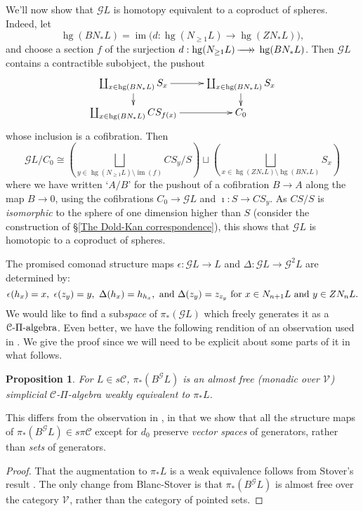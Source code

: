 \documentclass[11pt]{amsart} \renewcommand{\baselinestretch}{1.4}
\theoremstyle{plain}
\newtheorem{prop}[thm]{Proposition}
\theoremstyle{definition}
\DeclareMathOperator{\im}{im}
\DeclareMathOperator{\homog}{hg}
\renewcommand{\to}{\longrightarrow}
\newcommand{\scrG}{\mathscr{G}}
\newcommand{\calV}{\mathcal{V}}
\newcommand{\calc}{\mathcal{C}}
\newcommand{\citeBOX}[2][]{\cite[\mbox{#1}]{#2}}
\newcommand{\vect}[2]{\calV^{#1}_{#2}}
\newcommand{\BSW}{{\scrG}}
\newcommand{\PA}[1]{\pi#1}
\newcommand{\epi}{{\,\makebox[0cm][l]{\ensuremath\to}\to{}}}
\begin{document}
\begin{Composite functor spectral sequences}
We'll now show that $\BSW L$ is homotopy equivalent to a coproduct of spheres. Indeed,  let \[\homog(BN_*L)=\im \bigl(d:\homog(N_{\geq1}L)\to \homog(ZN_*L)\bigr),\]
 and choose a section $f$ of the surjection $d:\homog(N_{\geq1}L)\epi \homog(BN_*L)$. Then $\BSW L$ contains a contractible subobject, the pushout
\[\xymatrix@R=4mm{
\coprod_{x\in \homog(BN_*L)}S_{ x}
\ar[r]\ar[d]%
&%
\coprod_{x\in \homog(BN_*L)}S_{ x}\ar[d]\\%
\coprod_{x\in \homog(BN_*L)}CS_{ f(x)}
\ar[r]&%
C_0%
}\]
whose inclusion is a cofibration.  Then
\[\BSW L/C_0 \cong \left(\bigsqcup_{y\in \homog(N_{\geq1}L)\setminus\im (f)}CS_{ y}/S\right) \sqcup\left(\bigsqcup_{x\in \homog(ZN_*L)\setminus \homog(BN_*L)}S_{ x}\right)\]
where we have written `$A/B$' for the pushout of a cofibration $B\to A$ along the map $B\to0$, using the cofibrations $C_0\to \BSW L$ and $\imath:S\to CS_{ y}$.
As $CS/S$ is \emph{isomorphic} to the  sphere of one dimension higher than $S$ (consider the construction of \S\ref{The Dold-Kan correspondence}), this shows that $\BSW L$ is homotopic to a coproduct of spheres.

The promised comonad structure maps $\epsilon:\BSW L\to L$ and $\Delta:\BSW L\to \BSW^2L$ are determined by:
\[\epsilon(h_x)=x,\ \epsilon(z_y)=y,\ \Delta(h_x)=h_{h_x},\textup{ and }\Delta(z_y)=z_{z_y}\textup{ for $x\in N_{n+1}L$ and $y\in ZN_nL$.}\]
We would like to find a sub\emph{space} of $\pi_*(\BSW L)$ which freely generates it as a $\calc\textup{-$\Pi$-algebra}$. Even better, we have the following rendition of an observation used in  \cite[Proof of theorem 4.2]{Blanc_Stover-Groth_SS.pdf}. We give the proof since we will need to be explicit about some parts of it in what follows.
\begin{prop}
\label{Id of E2 grothen}
For $L\in s\calc$, $\pi_*(B^{\BSW}L)$ is an almost free (monadic over $\vect{}{}$) simplicial $\calc$-$\Pi$-algebra weakly equivalent to $\pi_*L$.
\end{prop}
\noindent This differs from the observation in \cite[Proof of theorem 4.2]{Blanc_Stover-Groth_SS.pdf}, in that we show that all the structure maps of $\pi_*(B^{\BSW}L)\in s\PA{\calc}$ except for $d_0$ preserve \emph{vector spaces} of generators, rather than \emph{sets} of generators.
\begin{proof}
That the augmentation to $\pi_*L$ is a weak equivalence follows from Stover's result \citeBOX[2.7]{StoverVanKampen.pdf}. The only change from Blanc-Stover is that $\pi_*(B^{\BSW}L)$ is almost free over the category $\vect{}{}$, rather than the category of pointed sets.


\end{proof}
\end{Composite functor spectral sequences}
\end{document}
